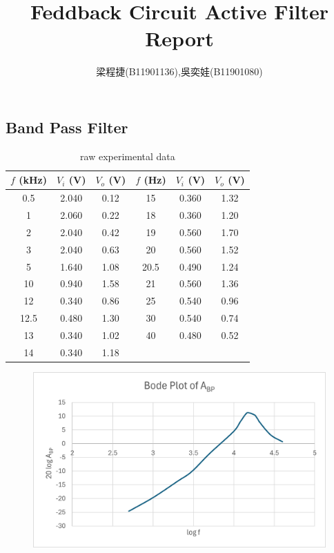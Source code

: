 \documentclass{article}
\title{Feddback Circuit Active Filter Report}
\author{梁程捷(B11901136),吳奕娃(B11901080)}
\date{}
\begin{document}
\begin{CJK*}{UTF8}{bkai}
\maketitle

\section*{Band Pass Filter}
\begin{minipage}{0.5\textwidth}
\begin{table}[H]
\begin{tabular}{|c|c|c||c|c|c|}
    \hline
    $f$ (\unit{\kilo\hertz}) &  $V_i$ (V)& $V_o$ (V) & $f$ (\unit{\hertz}) &  $V_i$ (V)& $V_o$ (V)\\
    \hline\hline
    0.5	    & 2.040 & 0.12 & 15     & 0.360 & 1.32   \\
    1       & 2.060 & 0.22 & 18     & 0.360 & 1.20  \\
    2	    & 2.040 & 0.42 & 19     & 0.560 & 1.70  \\
    3	    & 2.040 & 0.63 & 20     & 0.560 & 1.52   \\
    5	    & 1.640 & 1.08 & 20.5   & 0.490 & 1.24   \\
    10	    & 0.940 & 1.58 & 21     & 0.560 & 1.36   \\
    12	    & 0.340 & 0.86 & 25     & 0.540 & 0.96   \\
    12.5	& 0.480 & 1.30 & 30     & 0.540 & 0.74   \\
    13      & 0.340 & 1.02 & 40     & 0.480 & 0.52   \\
    14      & 0.340 & 1.18 &        &       &        \\
\hline
\end{tabular}
\caption{raw experimental data}
\end{table}
\end{minipage}\hspace{20mm}
\begin{minipage}{0.5\textwidth}
    \begin{figure}[H]    
        \includegraphics[scale=0.55]{Abp_bode_plot.png}

\end{figure}
\end{minipage}
\end{CJK*}
\end{document}
